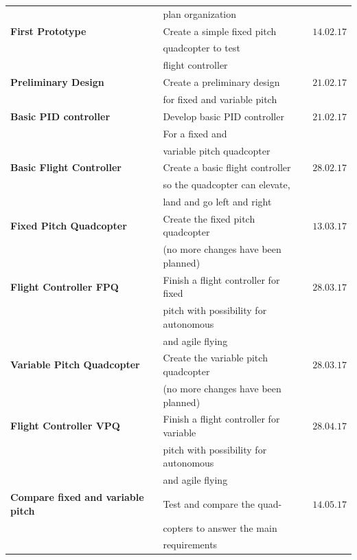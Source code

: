 \begin{table}[h]
\begin{tabular}{llc}
                                     & plan organization & \\
\rowcolor{green}
\textbf{First Prototype} & Create a simple fixed pitch & $14.02.17$ \\\rowcolor{green}
                         & quadcopter to test & \\\rowcolor{green}
                         & flight controller & 
                         \\\rowcolor{green}
\textbf{Preliminary Design} & Create a preliminary design & $21.02.17$ 
\\\rowcolor{green}
                            & for fixed and variable pitch & \\\rowcolor{green}
\textbf{Basic PID controller} & Develop basic PID controller & $21.02.17$ \\\rowcolor{green}
                                 & For a fixed and & \\\rowcolor{green}
                                 & variable pitch quadcopter & \\\rowcolor{green}
\textbf{Basic Flight Controller} & Create a basic flight controller & $28.02.17$ \\\rowcolor{green}
                                 & so the quadcopter can elevate, & \\\rowcolor{green}
                                 & land and go left and right & \\\rowcolor{green}
\textbf{Fixed Pitch Quadcopter} & Create the fixed pitch quadcopter & $13.03.17$ \\\rowcolor{green}
                                & (no more changes have been planned) & \\\rowcolor{yellow}
\textbf{Flight Controller FPQ}  & Finish a flight controller for fixed & $28.03.17$ \\\rowcolor{yellow}
                                & pitch with possibility for autonomous & \\\rowcolor{yellow}
                                & and agile flying & \\\rowcolor{yellow}
\textbf{Variable Pitch Quadcopter}  & Create the variable pitch quadcopter & $28.03.17$ \\\rowcolor{yellow}
                                    & (no more changes have been planned) & \\
\textbf{Flight Controller VPQ}  & Finish a flight controller for variable & $28.04.17$ \\
                            & pitch with possibility for autonomous & \\
                            & and agile flying & \\\rowcolor{gainsboro}
\textbf{Compare fixed and variable pitch}  & Test and compare the quad- & $14.05.17$ \\\rowcolor{gainsboro}
                                           & copters to answer the main & \\\rowcolor{gainsboro}
                                           & requirements & 
\end{tabular}                                                               
\end{table}
